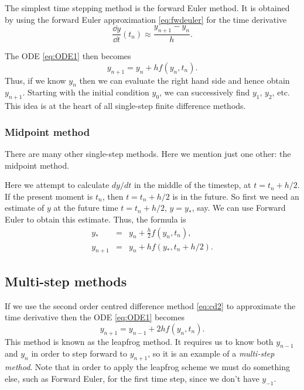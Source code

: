 The simplest time stepping method is the forward Euler method. 
It is obtained by using the forward Euler approximation \eqref{eq:fwdeuler}
for the time derivative
\begin{displaymath}
\frac{\dd y}{\dd t} (t_n) \approx \frac{y_{n+1} - y_n}{h}.
\end{displaymath}


\noindent
The ODE \eqref{eq:ODE1} then becomes
\begin{equation}
y_{n+1} = y_n + h f(y_n, t_n) .
\label{eq:fwdeulerstep}
\end{equation}
Thus, if we know $y_n$ then we can evaluate the right hand side and hence
obtain $y_{n+1}$.
Starting with the initial condition $y_0$, we can successively find $y_1$, $y_2$, etc.
This idea is at the heart of all
single-step finite difference methods. 


\subsubsection{Midpoint method}

There are many other single-step methods.
Here we mention just one other: the midpoint method.

Here we attempt to calculate $dy/dt$ in the middle of the timestep, at $t=t_n+h/2$.
If the present moment is $t_n$, then $t=t_n+h/2$ is in the future. So first we need an
estimate of $y$ at the future time $t=t_n+h/2$, $y = y_*$, say. We can use
Forward Euler to obtain this estimate. Thus, the formula is
\begin{eqnarray*}
	y_* & = & y_n + \frac{h}{2} f(y_n, t_n),\\
	y_{n+1} & = & y_n + h f\left(y_*, t_n+ h/2 \right).
\end{eqnarray*}


\subsection{Multi-step methods}

If we use the second order centred difference method \eqref{eq:cd2} to approximate the
time derivative then the ODE \eqref{eq:ODE1} becomes
\begin{equation}
y_{n+1} = y_{n-1} + 2hf(y_n,t_n) .
\end{equation}
This method is known as the leapfrog method. It requires us to know both $y_{n-1}$
and $y_n$ in order to step forward to $y_{n+1}$, so it is an example of a
\textit{multi-step method}. 
Note that in order to apply the leapfrog scheme we must do something else,
such as Forward Euler, for the first time step, since we don't have $y_{-1}$.


